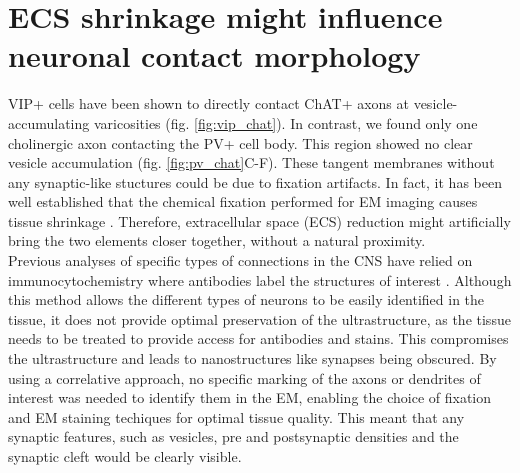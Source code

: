 \section{ECS shrinkage might influence neuronal contact morphology}
\label{sec:ECS}
VIP+ cells have been shown to directly contact ChAT+ axons at vesicle-accumulating varicosities (fig. \ref{fig:vip_chat}). In contrast, we found only one cholinergic axon contacting the PV+ cell body. This region showed no clear vesicle accumulation (fig. \ref{fig:pv_chat}C-F). These tangent membranes without any synaptic-like stuctures could be due to fixation artifacts. In fact, it has been well established that the chemical fixation performed for EM imaging causes tissue shrinkage \citep{Boyde1980}. Therefore, extracellular space (ECS) reduction might artificially bring the two elements closer together, without a natural proximity.\\
Previous analyses of specific types of connections in the CNS have relied on immunocytochemistry where antibodies label the structures of interest \citep{Bopp2017}. Although this method allows the different types of neurons to be easily identified in the tissue, it does not provide optimal preservation of the ultrastructure, as the tissue needs to be treated to provide access for antibodies and stains. This compromises the ultrastructure and leads to nanostructures like synapses being obscured. By using a correlative approach, no specific marking of the axons or dendrites of interest was needed to identify them in the EM, enabling the choice of fixation and EM staining techiques for optimal tissue quality. This meant that any synaptic features, such as vesicles, pre and postsynaptic densities and the synaptic cleft would be clearly visible.
